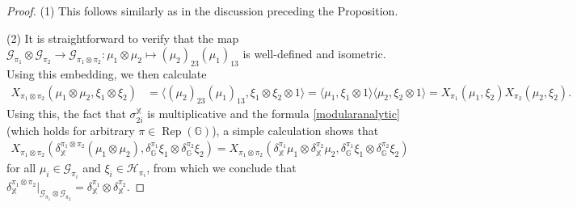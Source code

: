 \documentclass[reqno]{amsart}
\numberwithin{equation}{section}
\DeclareMathOperator{\Rep}{\mathrm{Rep}}
\newcommand{\mcG}{\mathcal{G}}
\newcommand{\mcH}{\mathcal{H}}
\newcommand{\G}{\mathbb{G}}
\newcommand{\X}{\mathbb{X}}
\begin{document}
\begin{proof} (1) This follows similarly as in  the discussion preceding the Proposition.

(2) It is straightforward to verify that the map $\mathcal{G}_{\pi_1}\otimes \mathcal{G}_{\pi_2}\to \mathcal{G}_{\pi_1\otimes \pi_2}: \mu_1 \otimes \mu_2 \mapsto (\mu_{2})_{23}(\mu_1)_{13}$ is well-defined and isometric. Using this embedding, we then calculate
\begin{align*}
    X_{\pi_1\otimes \pi_2}(\mu_1\otimes \mu_2, \xi_1\otimes \xi_2) &= \langle (\mu_{2})_{23}(\mu_{1})_{13}, \xi_1\otimes \xi_2 \otimes 1\rangle = \langle \mu_1, \xi_1\otimes 1\rangle \langle \mu_2, \xi_2\otimes 1\rangle  = X_{\pi_1}(\mu_1, \xi_2)X_{\pi_2}(\mu_2, \xi_2).
\end{align*}
Using this, the fact that $\sigma_{2i}^\X$ is multiplicative and the formula \eqref{modularanalytic} (which holds for arbitrary $\pi\in \Rep(\G)$), a simple calculation shows that
\begin{align*}
    X_{\pi_1\otimes \pi_2}(\delta_\X^{\pi_1\otimes \pi_2}(\mu_1\otimes \mu_2), \delta_\G^{\pi_1}\xi_1 \otimes \delta_\G^{\pi_2}\xi_2) = X_{\pi_1\otimes \pi_2}(\delta_\X^{\pi_1}\mu_1\otimes \delta_\X^{\pi_2} \mu_2, \delta_\G^{\pi_1}\xi_1\otimes \delta_\G^{\pi_2}\xi_2)
\end{align*}
for all $\mu_i\in \mcG_{\pi_i}$ and $\xi_i \in \mcH_{\pi_i}$, from which we conclude that $\delta_{\X}^{\pi_1\otimes \pi_2}\vert_{\mcG_{\pi_1}\otimes \mcG_{\pi_2}}= \delta_\X^{\pi_1}\otimes \delta_\X^{\pi_2}$.


\end{proof}
\end{document}

